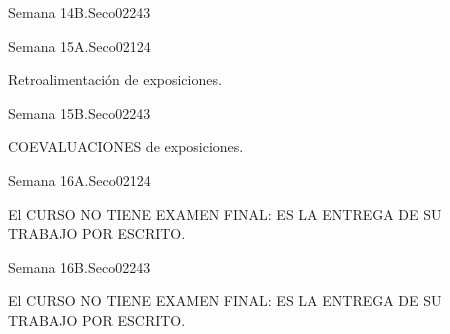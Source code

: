 \begin{syllabus}
\begin{unit}{Semana 14B.}{Seco02}{24}{3}
   \begin{learningoutcomes}
      \item 
      \item
      \item 
      \end{learningoutcomes}
\end{unit}

\begin{unit}{Semana 15A.}{Seco02}{12}{4}
   \begin{topics}
      \item Retroalimentación de exposiciones.
   \end{topics}
   \begin{learningoutcomes}
      \item 
   \end{learningoutcomes}
\end{unit}

\begin{unit}{Semana 15B.}{Seco02}{24}{3}
   \begin{topics}
      \item COEVALUACIONES de exposiciones.
   \end{topics}

   \begin{learningoutcomes}
      \item 
      \item
      \item 
      \end{learningoutcomes}
\end{unit}

\begin{unit}{Semana 16A.}{Seco02}{12}{4}
   \begin{topics}
      \item El CURSO NO TIENE EXAMEN FINAL: ES LA ENTREGA DE SU TRABAJO POR ESCRITO.
   \end{topics}
   \begin{learningoutcomes}
      \item 
   \end{learningoutcomes}
\end{unit}

\begin{unit}{Semana 16B.}{Seco02}{24}{3}
   \begin{topics}
      \item El CURSO NO TIENE EXAMEN FINAL: ES LA ENTREGA DE SU TRABAJO POR ESCRITO.
   \end{topics}

   \begin{learningoutcomes}
      \item 
      \item
      \item 
      \end{learningoutcomes}
\end{unit}


\begin{coursebibliography}
\end{coursebibliography}

\end{syllabus}
